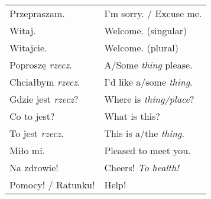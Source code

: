 \documentclass[12pt]{refcard}
\begin{document}
\begin{tabular}{ll}
Przepraszam.           & I'm sorry. / Excuse me.        \\[1ex]

Witaj.                 & Welcome. (singular)            \\
Witajcie.              & Welcome. (plural)              \\

Poproszę \emph{rzecz}. & A/Some \emph{thing} please.    \\
Chciałbym \emph{rzecz}. & I'd like a/some \emph{thing}. \\
Gdzie jest \emph{rzecz}? & Where is \emph{thing/place}? \\
Co to jest?            & What is this?                  \\
To jest \emph{rzecz}.  & This is a/the \emph{thing}.    \\[1ex]

Miło mi.               & Pleased to meet you.           \\[1ex]
Na zdrowie!            & Cheers! \emph{To health!}      \\
Pomocy! / Ratunku!     & Help!                          \\
\end{tabular}
\end{document}
